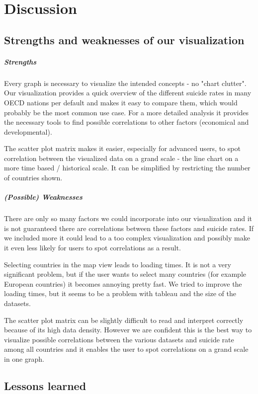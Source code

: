 \documentclass{vgtc}                          %
\begin{document}
\section{Discussion}

\subsection{Strengths and weaknesses of our visualization}

\subparagraph{Strengths}
Every graph is necessary to visualize the intended concepts - no "chart clutter". Our visualization provides a quick overview of the different suicide rates in many OECD nations per default and makes it easy to compare them, which would probably be the most common use case. For a more detailed analysis it provides the necessary tools to find possible correlations to other factors (economical and developmental).

The scatter plot matrix makes it easier, especially for advanced users, to spot correlation between the visualized data on a grand scale - the line chart on a more time based / historical scale. It can be simplified by restricting the number of countries shown.

\subparagraph{(Possible) Weaknesses}
There are only so many factors we could incorporate into our visualization and it is not guaranteed there are correlations between these factors and suicide rates. If we included more it could lead to a too complex visualization and possibly make it even less likely for users to spot correlations as a result.

Selecting countries in the map view leads to loading times. It is not a very significant problem, but if the user wants to select many countries (for example European countries) it becomes annoying pretty fast. We tried to improve the loading times, but it seems to be a problem with tableau and the size of the datasets.

The scatter plot matrix can be slightly difficult to read and interpret correctly because of its high data density. However we are confident this is the best way to visualize possible correlations between the various datasets and suicide rate among all countries and it enables the user to spot correlations on a grand scale in one graph.

\subsection{Lessons learned}
\end{document}
